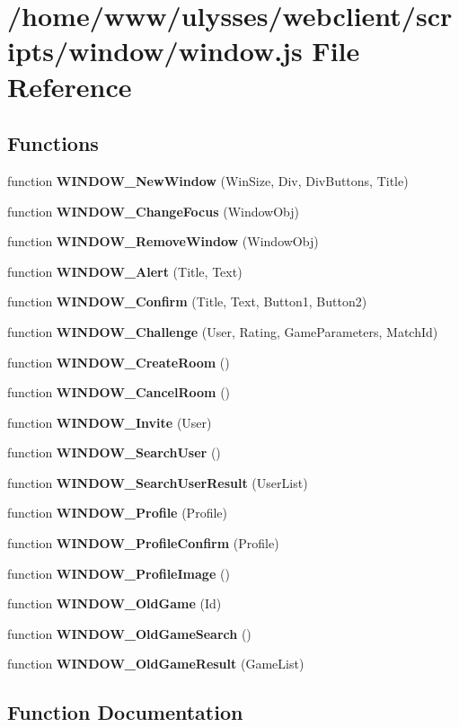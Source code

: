 \section{/home/www/ulysses/webclient/scripts/window/window.js File Reference}
\label{window_2window_8js}
\subsection*{Functions}
\begin{CompactItemize}
\item 
function {\bf WINDOW\_\-NewWindow} (WinSize, Div, DivButtons, Title)
\item 
function {\bf WINDOW\_\-ChangeFocus} (WindowObj)
\item 
function {\bf WINDOW\_\-RemoveWindow} (WindowObj)
\item 
function {\bf WINDOW\_\-Alert} (Title, Text)
\item 
function {\bf WINDOW\_\-Confirm} (Title, Text, Button1, Button2)
\item 
function {\bf WINDOW\_\-Challenge} (User, Rating, GameParameters, MatchId)
\item 
function {\bf WINDOW\_\-CreateRoom} ()
\item 
function {\bf WINDOW\_\-CancelRoom} ()
\item 
function {\bf WINDOW\_\-Invite} (User)
\item 
function {\bf WINDOW\_\-SearchUser} ()
\item 
function {\bf WINDOW\_\-SearchUserResult} (UserList)
\item 
function {\bf WINDOW\_\-Profile} (Profile)
\item 
function {\bf WINDOW\_\-ProfileConfirm} (Profile)
\item 
function {\bf WINDOW\_\-ProfileImage} ()
\item 
function {\bf WINDOW\_\-OldGame} (Id)
\item 
function {\bf WINDOW\_\-OldGameSearch} ()
\item 
function {\bf WINDOW\_\-OldGameResult} (GameList)
\end{CompactItemize}


\subsection{Function Documentation}

